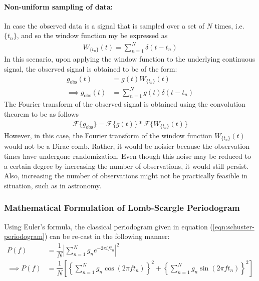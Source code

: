     			\paragraph{Non-uniform sampling of data:}
    			In case the observed data is a signal that is sampled over a set of $N$ times, i.e. $\{t_n\}$, and so the window function my be expressed as
    			\begin{align}
    				W_{\{t_n\}}(t)=\sum_{n=1}^{N}{\delta(t-t_n)} \label{eqn:nonunif-dirac-comb}
    			\end{align}
    			In this scenario, upon applying the window function to the underlying continuous signal, the observed signal is obtained to be of the form:
    			\begin{align}
    				g_\text{obs}(t)&=g(t)W_{\{t_n\}}(t) \nonumber \\
    				\implies g_\text{obs}(t)&=\sum_{n=1}^{N}{g(t)\delta(t-t_n)} \label{eqn:obs-func-nonunif}
    			\end{align}
    			The Fourier transform of the observed signal is obtained using the convolution theorem to be as follows
    			\begin{align}
    				\mathscr{F}\{g_\text{obs}\}=\mathscr{F}\{g(t)\}*\mathscr{F}\{W_{\{t_n\}}(t)\} \label{eqn:FT-obs-func-nonunif}
    			\end{align}
    			However, in this case, the Fourier transform of the window function $W_{\{t_n\}}(t)$ would not be a Dirac comb. Rather, it would be noisier because the observation times have undergone randomization. Even though this noise may be reduced to a certain degree by increasing the number of observations, it would still persist. Also, increasing the number of observations might not be practically feasible in situation, such as in astronomy.
    				
    		\subsubsection{Mathematical Formulation of Lomb-Scargle Periodogram}
    			Using Euler's formula, the classical periodogram given in equation (\ref{eqn:schuster-periodogram}) can be re-cast in the following manner:
    			\begin{align}
    				P(f)&=\dfrac{1}{N}\left| \sum_{n=1}^{N}{g_ne^{-2\pi i ft_n}} \right|^2 \nonumber \\
    				\implies P(f)&=\dfrac{1}{N}\left[ \left\lbrace \sum_{n=1}^{N}{g_n\cos{(2\pi ft_n)}} \right\rbrace^2 + \left\lbrace \sum_{n=1}^{N}{g_n\sin{(2\pi ft_n)}} \right\rbrace^2 \right] \label{eqn:lomb-scargle-01}
    			\end{align}

